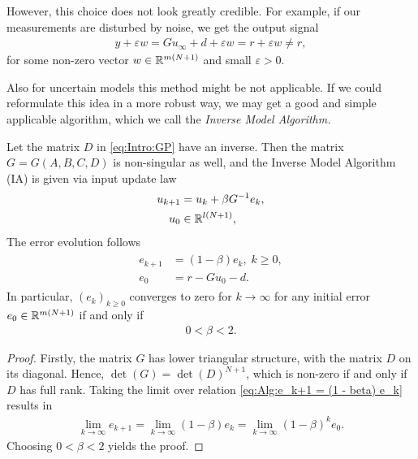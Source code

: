 However, this choice does not look greatly credible. 
For example, if our measurements are disturbed by noise, we get the output signal
\begin{align}
y + \varepsilon w = G u_\infty + d + \varepsilon w = r + \varepsilon w \neq r,
\end{align}
for some non-zero vector $w \in {\mathbb{R}}^{m(N+1)}$ and small $\varepsilon > 0$. 

Also for uncertain models this method might be not applicable. 
If we could reformulate this idea in a more robust way, we may get a good and simple applicable algorithm, which we call the \textit{Inverse Model Algorithm.}


\begin{alg}
	\label{alg:ILC:IA}
	Let the matrix $D$ in \eqref{eq:Intro:GP} have an inverse. Then the matrix $G = G(A, B, C, D)$ is non-singular as well, and the Inverse Model Algorithm (IA) is given via input update law 
	\begin{align}
	\label{eq:errRightInv}
	\begin{split}
	u_{k+1} &= u_k + \beta G^{-1} e_k, \\
	u_0 & \in {\mathbb{R}}^{l (N+1)},
	\end{split}	
	\end{align}
	The error evolution follows
	\begin{align}
	\label{eq:Alg:e_k+1 = (1 - beta) e_k}
	\begin{split}
	e_{k+1} &= (1- \beta) e_{k}, \; k\geq 0, \\
	e_0 &= r -  Gu_0 -d.
	\end{split}
	\end{align}
	In particular, $(e_k)_{k\geq 0}$ converges to zero for $k \to \infty$ for any initial error $e_0 \in {\mathbb{R}}^{m(N+1)}$ if and only if 
	\begin{align*}
	0 < \beta < 2.
	\end{align*}
\end{alg}
\begin{proof}
	Firstly, the matrix $G$ has lower triangular structure, with the matrix $D$ on its diagonal. Hence, $\det(G) = \det(D)^{N+1}$, which is non-zero if and only if $D$ has full rank. 
	Taking the limit over relation \eqref{eq:Alg:e_k+1 = (1 - beta) e_k} results in
	\begin{align}
	\lim_{k \to \infty} e_{k+1} = \lim_{k \to \infty}(1- \beta) e_{k} = \lim_{k \to \infty}(1 - \beta)^k e_0.
	\end{align}
	Choosing $0<\beta < 2$ yields the proof. 
\end{proof}


